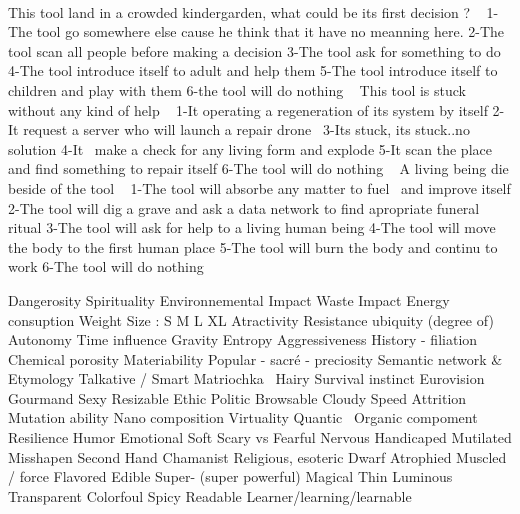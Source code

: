 ~

This tool land in a crowded kindergarden, what could be its first
decision ?
~
1-The tool go somewhere else cause he think that it have no meanning
here.
2-The tool scan all people before making a decision
3-The tool ask for something to do
4-The tool introduce itself to adult and help them
5-The tool introduce itself to children and play with them
6-the tool will do nothing
~
This tool is stuck without any kind of help
~
1-It operating a regeneration of its system by itself
2-It request a server who will launch a repair drone~
3-Its stuck, its stuck..no solution
4-It~ make a check for any living form and explode
5-It scan the place and find something to repair itself
6-The tool will do nothing
~
A living being die beside of the tool
~
1-The tool will absorbe any matter to fuel~ and improve itself
2-The tool will dig a grave and ask a data network to find apropriate
funeral ritual
3-The tool will ask for help to a living human being
4-The tool will move the body to the first human place
5-The tool will burn the body and continu to work
6-The tool will do nothing
~


\bigskip
{}

Dangerosity
Spirituality
Environnemental Impact
Waste Impact
Energy consuption
Weight
Size : S M L XL
Atractivity
Resistance
ubiquity (degree of)
Autonomy
Time influence
Gravity
Entropy
Aggressiveness
History - filiation
Chemical porosity
Materiability
Popular - sacr\'e - preciosity
Semantic network \& Etymology
Talkative / Smart
Matriochka~
Hairy
Survival instinct
Eurovision
Gourmand
Sexy
Resizable
Ethic
Politic
Browsable
Cloudy
Speed
Attrition
Mutation ability
Nano composition
Virtuality
Quantic~
Organic compoment
Resilience
Humor
Emotional
Soft
Scary vs Fearful
Nervous
Handicaped
Mutilated
Misshapen
Second Hand
Chamanist
Religious, esoteric
Dwarf
Atrophied
Muscled / force
Flavored
Edible
Super- (super powerful)
Magical
Thin
Luminous
Transparent
Colorfoul
Spicy
Readable
Learner/learning/learnable
~
~

~

